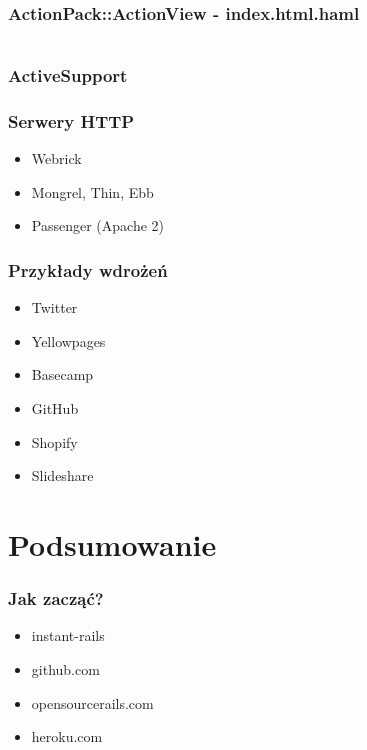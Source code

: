 \documentclass[12t]{beamer}
\begin{document}
\begin{frame}[fragile]
  \frametitle{ActionPack::ActionView - index.html.haml}
  \begin{footnotesize}
  \begin{columns}[T]
    \begin{column}{4cm}
      
    \end{column}
    \begin{column}{6cm}
      
    \end{column}
  \end{columns}
  \end{footnotesize}
\end{frame}

\begin{frame}
  \frametitle{ActiveSupport}
  
\end{frame}

\begin{frame}
  \frametitle{Serwery HTTP}
  \begin{itemize}
  \item Webrick
  \item Mongrel, Thin, Ebb
  \item Passenger (Apache 2)
  \end{itemize}
\end{frame}

\begin{frame}
  \frametitle{Przykłady wdrożeń}
  \begin{itemize}
  \item Twitter
  \item Yellowpages
  \item Basecamp
  \item GitHub
  \item Shopify
  \item Slideshare
  \end{itemize}
\end{frame}

\section{Podsumowanie}
\begin{frame}
  \frametitle{Jak zacząć?}
  \begin{itemize}
  \item instant-rails
  \item github.com
  \item opensourcerails.com
  \item heroku.com
  \end{itemize}
\end{frame}
\end{document}
